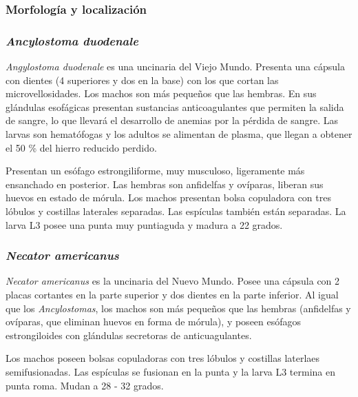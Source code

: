\subsubsection{Morfología y localización}
\begin{multicols}{2}
	\subsubsection*{\textit{Ancylostoma duodenale}}
	\textit{Angylostoma duodenale} es una uncinaria del Viejo Mundo. Presenta una cápsula con dientes (4 superiores y dos en la base) con los que cortan las microvellosidades. Los machos son más pequeños que las hembras. En sus glándulas esofágicas presentan sustancias anticoagulantes que permiten la salida de sangre, lo que llevará el desarrollo de anemias por la pérdida de sangre. Las larvas son hematófogas y los adultos se alimentan de plasma, que llegan a obtener el 50 \% del hierro reducido perdido.
	
	Presentan un esófago estrongiliforme, muy musculoso, ligeramente más ensanchado en posterior. Las hembras son anfidelfas y ovíparas, liberan sus huevos en estado de mórula. Los machos presentan bolsa copuladora con tres lóbulos y costillas laterales separadas. Las espículas también están separadas. La larva L3 posee una punta muy puntiaguda y madura a 22 grados.
	\columnbreak
	\subsubsection*{\textit{Necator americanus}}
	\textit{Necator americanus} es la uncinaria del Nuevo Mundo. Posee una cápsula con 2 placas cortantes en la parte superior y dos dientes en la parte inferior.  Al igual que los \textit{Ancylostomas}, los machos son más pequeños que las hembras (anfidelfas y ovíparas, que eliminan huevos en forma de mórula), y poseen esófagos estrongiloides con glándulas secretoras de anticuagulantes.
	
	Los machos poseen bolsas copuladoras  con tres lóbulos y costillas laterlaes semifusionadas. Las espículas se fusionan en la punta y la larva L3 termina en punta roma. Mudan a 28 - 32 grados.
\end{multicols}
\vspace*{-1cm}
